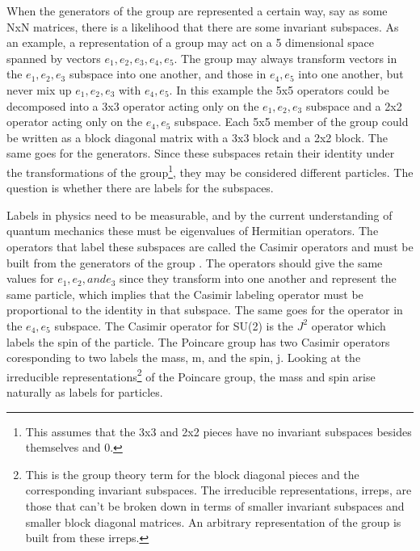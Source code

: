 \documentclass[12pt]{article}
\begin{document}
When the generators of the group are represented a certain way, say as some NxN matrices, there is a likelihood that there are some invariant subspaces. As an example, a representation of a group may act on a 5 dimensional space spanned by vectors $e_1, e_2, e_3, e_4, e_5$. The group may always transform vectors in the $e_1, e_2, e_3$ subspace into one another, and those in $e_4, e_5$ into one another, but never mix up $e_1, e_2, e_3$ with $e_4, e_5$. In this example the 5x5 operators could be decomposed into a 3x3 operator acting only on the $e_1, e_2, e_3$ subspace and a 2x2 operator acting only on the $e_4, e_5$ subspace. Each 5x5 member of the group could be written as a block diagonal matrix with a 3x3 block and a 2x2 block. The same goes for the generators. Since these subspaces retain their identity under the transformations of the group\footnote{This assumes that the 3x3 and 2x2 pieces have no invariant subspaces besides themselves and 0.}, they may be considered different particles. The question is whether there are labels for the subspaces.  

Labels in physics need to be measurable, and by the current understanding of quantum mechanics these must be eigenvalues of Hermitian operators. The operators that label these subspaces are called the Casimir operators and must be built from the generators of the group \cite{weinberg,wigner}. The operators should give the same values for $e_1, e_2, and e_3$ since they transform into one another and represent the same particle, which implies that the Casimir labeling operator must be proportional to the identity in that subspace. The same goes for the operator in the $e_4, e_5$ subspace. The Casimir operator for SU(2) is the $J^2$ operator which labels the spin of the particle. The Poincare group has two Casimir operators coresponding to two labels the mass, m, and the spin, j. Looking at the irreducible representations\footnote{This is the group theory term for the block diagonal pieces and the corresponding invariant subspaces. The irreducible representations, irreps, are those that can't be broken down in terms of smaller invariant subspaces and smaller block diagonal matrices. An arbitrary representation of the group is built from these irreps.} of the Poincare group, the mass and spin arise naturally as labels for particles. 

\end{document}
